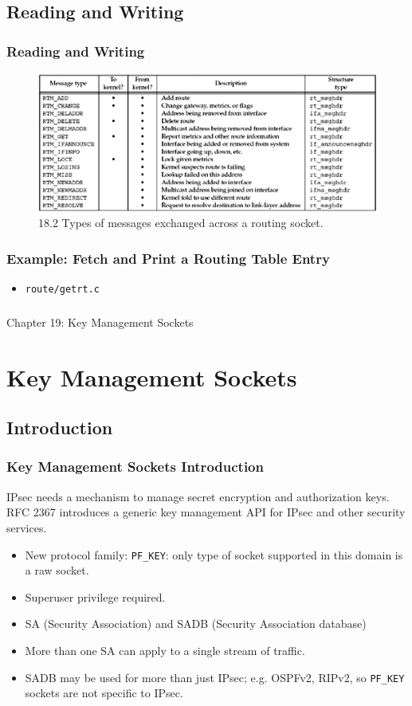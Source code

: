 \documentclass[notes,serif]{beamer}
\begin{document}
\subsection{Reading and Writing}
\begin{frame}
  \frametitle{Reading and Writing}
  \begin{figure}
    \includegraphics[width=.7\textwidth]{figs/18fig02}
    \caption{18.2 Types of messages exchanged across a routing socket.}
  \end{figure}
\end{frame}

\begin{frame}
  \frametitle{Example: Fetch and Print a Routing Table Entry}
  \begin{itemize}
    \item \texttt{route/getrt.c}
  \end{itemize}
\end{frame}

\begin{frame}
  \frametitle{}
  \begin{block}{}
    \begin{center}
    {\Large Chapter 19: Key Management Sockets}      
    \end{center}
  \end{block}
\end{frame}
\section{Key Management Sockets}
\subsection{Introduction}
\begin{frame}
  \frametitle{Key Management Sockets Introduction}
  IPsec needs a mechanism to manage secret encryption and authorization keys.  RFC 2367 introduces a generic key management API for IPsec and other security services.
\begin{itemize}
  \item New protocol family: \texttt{PF\_KEY}: only type of socket supported in this domain is a raw socket.
  \item Superuser privilege required.
  \item SA (Security Association) and SADB (Security Association database)
  \item More than one SA can apply to a single stream of traffic.
  \item SADB may be used for more than just IPsec; e.g. OSPFv2, RIPv2, so \texttt{PF\_KEY} sockets are not specific to IPsec.
\end{itemize}
\end{frame}
\end{document}
